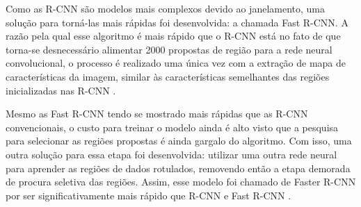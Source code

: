 Como as R-CNN são modelos mais complexos devido ao janelamento, uma solução para torná-las mais rápidas foi desenvolvida: a chamada Fast R-CNN. A razão pela qual esse algoritmo é mais rápido que o R-CNN está no fato de que torna-se desnecessário alimentar 2000 propostas de região para a rede neural convolucional, o processo é realizado uma única vez com a extração de mapa de características da imagem, similar às características semelhantes das regiões inicializadas nas R-CNN \cite{Michelucci:2019}.

Mesmo as Fast R-CNN tendo se mostrado mais rápidas que as R-CNN convencionais, o custo para treinar o modelo ainda é alto visto que a pesquisa para selecionar as regiões propostas é ainda gargalo do algoritmo. Com isso, uma outra solução para essa etapa foi desenvolvida: utilizar uma outra rede neural para aprender as regiões de dados rotulados, removendo então a etapa demorada de procura seletiva das regiões. Assim, esse modelo foi chamado de Faster R-CNN por ser significativamente mais rápido que R-CNN e Fast R-CNN \cite{Michelucci:2019}.
